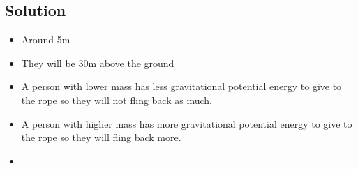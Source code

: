 \documentclass[a4paper, 10pt]{article}
\begin{document}
		\subsection{Solution}
			\begin{itemize}
				\item Around 5m
				\item They will be 30m above the ground
				\item A person with lower mass has less gravitational potential energy to give to the rope so they will not fling back as much.
				\item A person with higher mass has more gravitational potential energy to give to the rope so they will fling back more.
				\item 
				
			\end{itemize}
\end{document}

